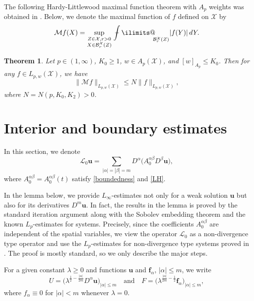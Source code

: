 \documentclass[reqno]{amsart}
\numberwithin{equation}{section}
\theoremstyle{plain}
\newtheorem{theorem}{Theorem}[section]
\theoremstyle{definition}
\theoremstyle{remark}
\begin{document}
The following Hardy-Littlewood maximal function theorem with $A_p$ weights was obtained in \cite{MR0740173}.
Below, we denote the maximal function of $f$ defined on ${\mathcal{X}}$ by 
\begin{equation}		\label{160617@eq1}
{\mathcal{M}} f(X)=\sup_{\substack{Z\in {\mathcal{X}}, r>0\\ X\in {\mathcal{B}}_r^{\mathcal{X}}(Z)}}{\operatorname{\,\,\text{\bf--}\kern-.98em\DOTSI\intop\ilimits@\!\!}}_{{\mathcal{B}}_r^{\mathcal{X}}(Z)}|f(Y)|\, dY.
\end{equation}

\begin{theorem}		\label{1008@thm5}
Let $p\in (1,\infty)$, $K_0 \ge 1$, $w\in A_p({\mathcal{X}})$, and $[w]_{A_p}\le K_0$.
Then for any $f\in L_{p,w}({\mathcal{X}})$, we have 
\[
\|{\mathcal{M}} f\|_{L_{p,w}({\mathcal{X}})}\le N\|f\|_{L_{p,w}({\mathcal{X}})},
\]
where $N=N(p,K_0, K_2)>0$.
\end{theorem}

\section{Interior and boundary estimates}		

In this section, we denote
\begin{equation*}
{\mathcal{L}}_0{\boldsymbol{u}}=\sum_{|\alpha|=|\beta|=m}D^\alpha\big({A}^{\alpha\beta}_0D^\beta{\boldsymbol{u}}\big),
\end{equation*}
where $A_0^{\alpha\beta}=A_0^{\alpha\beta}(t)$ satisfy \eqref{boundedness} and \eqref{LH}.

In the lemma below, we provide $L_\infty$-estimates not only for a weak solution ${\boldsymbol{u}}$ but also for its derivatives $D^m {\boldsymbol{u}}$.
In fact, the results in the lemma is proved by the standard iteration argument along with the Sobolev embedding theorem and the known $L_p$-estimates for  systems.
Precisely, since the coefficients $A_0^{\alpha\beta}$ are independent of the spatial variables, we view the operator ${\mathcal{L}}_0$ as a non-divergence type operator and use the $L_p$-estimates for non-divergence type systems proved in \cite{MR2771670}.
The proof is mostly standard, so we only describe the major steps.

For a given constant $\lambda \ge 0$ and functions ${\boldsymbol{u}}$ and ${\boldsymbol{f}}_\alpha$, $|\alpha| \le m$, we write
\begin{equation}
							\label{eq0223_01}		
U=\big(\lambda^{\frac{1}{2}-\frac{|\alpha|}{2m}}D^\alpha {\boldsymbol{u}}\big)_{|\alpha| \le m} \quad \text{and}\quad F=\big(\lambda^{\frac{|\alpha|}{2m}-\frac{1}{2}}{\boldsymbol{f}}_\alpha\big)_{|\alpha| \le m},
\end{equation}
where $f_\alpha \equiv 0$ for $|\alpha|<m$ whenever $\lambda = 0$.
\end{document}

